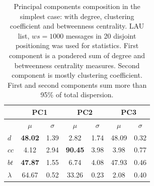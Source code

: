 \documentclass[%
 aip,
 jmp,%
 amsmath,amssymb,
 reprint,%
]{revtex4-1}
\begin{document}
\begin{table}[H]
  \centering
  \caption{Principal components composition in the simplest case: with degree, clustering coefficient and betweenness centrality. LAU list, $ws=1000$ messages in 20 disjoint positioning was used for statistics. First component is a pondered sum of degree and betweenness centrality measures. Second component is mostly clustering coefficient. First and second components sum more than 95\% of total dispersion.}
  \begin{tabular}{|l|c|c| c|c| c|c|}\hline
 & \multicolumn{2}{c|}{PC1}          & \multicolumn{2}{c|}{PC2} & \multicolumn{2}{c|}{PC3}  \\\hline
       & $\mu$            & $\sigma$ & $\mu$         & $\sigma$ & $\mu$ & $\sigma$  \\\hline
$d$       & {\bf 48.02}   & 1.39     & 2.82          & 1.74     & 48.09  & 0.32 \\
$cc$      & 4.12          & 2.94     & {\bf 90.45}   & 3.98     & 3.98  & 0.77 \\ 
$bt$      & {\bf 47.87}   & 1.55     & 6.74          & 4.08     & 47.93 & 0.46 \\ \hline
$\lambda$ & 64.67         & 0.52     & 33.26         & 0.23     & 2.08  & 0.40 \\ \hline
  \end{tabular}
  \label{compPCA0}
\end{table}
\end{document}
